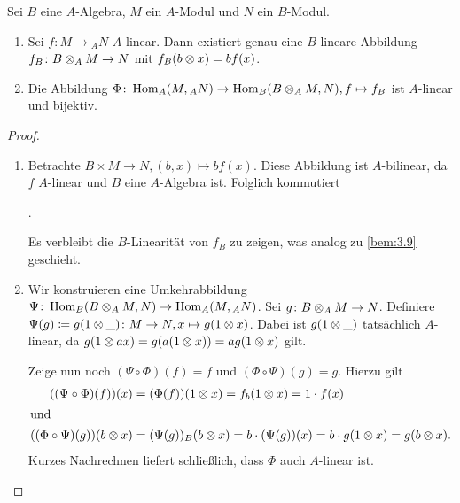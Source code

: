 \documentclass[12pt,a4paper]{scrartcl}
\theoremstyle{cplain}
\theoremstyle{cdef}
\begin{document}
\begin{satz}
	Sei $B$ eine $A$-Algebra, $M$ ein $A$-Modul und $N$ ein $B$-Modul.
	\begin{enumerate}
		\item Sei $f\colon M\to {}_AN$ $A$-linear. Dann existiert genau eine $B$-lineare Abbildung $f_B\colon B\otimes_AM\to N$ mit $f_B(b\otimes x) = bf(x)$. \label{thm:scalarerweiterung:i}
		\item Die Abbildung $\Phi\colon \operatorname{Hom}_A(M,{}_AN)\to \operatorname{Hom}_B(B\otimes_AM,N), f\mapsto f_B$ ist $A$-linear und bijektiv. \label{thm:scalarerweiterung:ii}
	\end{enumerate}
\end{satz}
\begin{proof}
	\leavevmode
	\begin{enumerate}[label=\ref{thm:scalarerweiterung:\roman*}]
		\item Betrachte $B\times M\to N, (b,x)\mapsto bf(x)$. Diese Abbildung ist $A$-bilinear, da $f$ $A$-linear und $B$ eine $A$-Algebra ist. Folglich kommutiert
		\begin{center}
			. %
		\end{center}
		Es verbleibt die $B$-Linearität von $f_B$ zu zeigen, was analog zu \cref{bem:3.9} geschieht.
		\item Wir konstruieren eine Umkehrabbildung $\Psi\colon \operatorname{Hom}_B(B\otimes_AM,N)\to \operatorname{Hom}_A(M,{}_AN)$. Sei $g\colon B\otimes_AM\to N$. Definiere $\Psi(g) \coloneqq g(1\otimes \_)\colon M\to N, x\mapsto g(1\otimes x)$.
		Dabei ist $g(1\otimes\_)$ tatsächlich $A$-linear, da $g(1\otimes ax ) = g(a(1\otimes x)) = ag(1\otimes x)$ gilt.
		
		Zeige nun noch $(\Psi\circ \Phi)(f) = f$ und $(\Phi\circ\Psi)(g) = g$. Hierzu gilt
		\begin{align*}
			((\Psi\circ\Phi)(f))(x) &= (\Phi(f))(1\otimes x) = f_b(1\otimes x) =1\cdot f(x) \\
			\intertext{und}
			((\Phi\circ\Psi)(g))(b\otimes x) &= (\Psi(g))_B(b\otimes x) = b\cdot (\Psi(g))(x) = b\cdot g(1\otimes x) = g(b\otimes x).
		\end{align*}
		Kurzes Nachrechnen liefert schließlich, dass $\Phi$ auch $A$-linear ist.
		\qedhere
	\end{enumerate}	
\end{proof}
\end{document}
